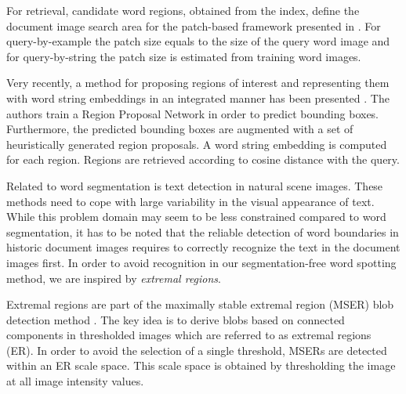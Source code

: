 For retrieval, candidate word
regions, obtained from the index, define the document image search area for the patch-based
framework presented in \cite{Ghosh15}. 
For query-by-example \cite{Ghosh15} the patch size equals to the size of the query word image
and for query-by-string \cite{Ghosh15a} the patch size is estimated from training word images.

Very recently, a method for proposing regions of interest and representing them with
word string embeddings in an integrated manner has been presented \cite{Wilkinson17}.
The authors train a Region Proposal Network in order to predict bounding boxes. Furthermore,
the predicted bounding boxes are augmented with a set of heuristically generated region proposals. 
A word string embedding is computed for each region. 
Regions are retrieved according to cosine distance with the query.

Related to word segmentation is text detection in natural scene images. 
These methods need to cope 
with large variability in the visual appearance of text.
While this problem domain may seem to be less constrained compared to word
segmentation, it has to be noted that the reliable detection of
word boundaries in historic document images requires to correctly recognize the text in the document
images first. In order to avoid recognition in our segmentation-free word spotting method, we
are inspired by \emph{extremal regions}. 

Extremal regions are part of the maximally stable extremal region (MSER) blob detection
method \cite{Matas04}. The key idea is to derive blobs based on connected components in 
thresholded images which are referred to as extremal regions (ER).
%
In order to
avoid the selection of a single threshold, MSERs are detected within an ER scale space. 
This scale space is obtained by thresholding the image at all
image intensity values. 

